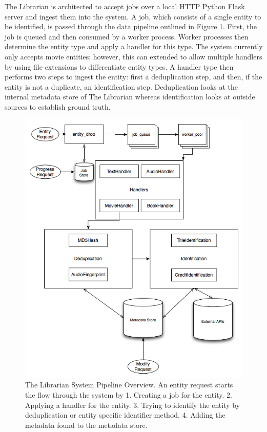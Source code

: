 \documentclass[paper=a4, fontsize=11pt]{scrartcl} %
\numberwithin{equation}{section} %
\numberwithin{figure}{section} %
\numberwithin{table}{section} %
\begin{document}
The Librarian is architected to accept jobs over a local HTTP Python Flask server and ingest them into the system. A job, which consists of a single entity to be identified, is passed through the data pipeline outlined in Figure \ref{fig:system-overview}. First, the job is queued and then consumed by a worker process. Worker processes then determine the entity type and apply a handler for this type. The system currently only accepts movie entities; however, this can extended to allow multiple handlers by using file extensions to differentiate entity types. A handler type then performs two steps to ingest the entity: first a deduplication step, and then, if the entity is not a duplicate, an identification step. Deduplication looks at the internal metadata store of The Librarian whereas identification looks at outside sources to establish ground truth. \\


\begin{figure}[H]
\center\includegraphics[scale=0.75]{system-overview.png}
\caption{The Librarian System Pipeline Overview. An entity request starts the flow through the system by 1. Creating a job for the entity. 2. Applying a handler for the entity. 3. Trying to identify the entity by deduplication or entity specific identifier method. 4. Adding the metadata found to the metadata store.}
\label{fig:system-overview}
\end{figure}
\end{document}
